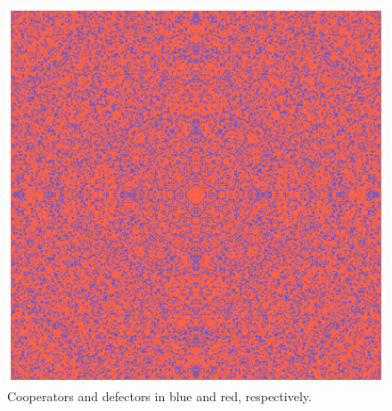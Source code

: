 \begin{figure}
    \centering
    \includegraphics[width=1\linewidth]{Images/P3/PD_GranPlot.eps}
    \caption{Cooperators and defectors in blue and red, respectively.}
    \label{fig:GranPlot}
\end{figure}

